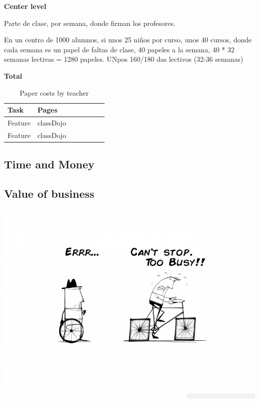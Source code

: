 \textbf{Center level}

Parte de clase, por semana, donde firman los profesores.

En un centro de 1000 alumnos, si unos 25 niños por curso, unos 40 cursos,
donde cada semana es un papel de faltas de clase, 40 papeles a la semana,
40 * 32 semanas lectivas = 1280 papeles.
UNpos 160/180 das lectivos (32-36 semanas)

\textbf{Total}



\begin{table}[]
\centering

\begin{tabular}{@{}lllllll@{}}

Task & Pages\\
\midrule

Feature & classDojo\\
Feature & classDojo\\

\end{tabular}
\caption{Paper costs by teacher}
\label{my-label}
\end{table}



\subsection{Time and Money}


\subsection{Value of business}



\includegraphics[scale=0.5]{img/toobusytoimprove.jpeg}


